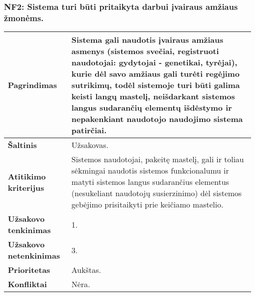 \documentclass[12pt]{article}
\begin{document}
\subsubsection*{NF2: Sistema turi būti pritaikyta darbui įvairaus amžiaus
žmonėms.}
\label{sec:NF2}
\begin{table}[htb!]
    \captionsetup{justification=centering}
    \begin{tabular}{|m{4.9cm}|m{11cm}|}
        \hline
        \raggedleft \textbf{\cellcolor{orange!30}Pagrindimas} &
        Sistema gali naudotis įvairaus amžiaus asmenys (sistemos svečiai,
        registruoti naudotojai: gydytojai - genetikai, tyrėjai), kurie dėl savo
        amžiaus gali turėti regėjimo sutrikimų, todėl sistemoje turi būti galima
        keisti langų mastelį, neišdarkant sistemos langus sudarančių elementų
        išdėstymo ir nepakenkiant naudotojo naudojimo sistema patirčiai. \\
        \hline
        \raggedleft \textbf{\cellcolor{orange!30}Šaltinis} & Užsakovas. \\
        \hline
        \raggedleft \textbf{\cellcolor{orange!30}Atitikimo kriterijus} & 
        Sistemos naudotojai, pakeitę mastelį, gali ir toliau sėkmingai naudotis
        sistemos funkcionalumu ir matyti sistemos langus sudarančius elementus
        (nesukeliant naudotojų susierzinimo) dėl sistemos gebėjimo prisitaikyti
        prie keičiamo mastelio. \\
        \hline
        \raggedleft \textbf{\cellcolor{orange!30}Užsakovo tenkinimas} & 1. \\
        \hline
        \raggedleft \textbf{\cellcolor{orange!30}Užsakovo netenkinimas} & 3. \\
        \hline
        \raggedleft \textbf{\cellcolor{orange!30}Prioritetas} & Aukštas. \\
        \hline
        \raggedleft \textbf{\cellcolor{orange!30}Konfliktai} & Nėra. \\
        \hline
    \end{tabular}
\end{table}

\newpage
\end{document}
